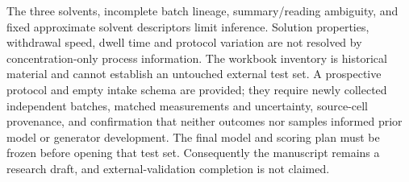 The three solvents, incomplete batch lineage, summary/reading ambiguity, and fixed approximate solvent descriptors limit inference. Solution properties, withdrawal speed, dwell time and protocol variation are not resolved by concentration-only process information. The workbook inventory is historical material and cannot establish an untouched external test set. A prospective protocol and empty intake schema are provided; they require newly collected independent batches, matched measurements and uncertainty, source-cell provenance, and confirmation that neither outcomes nor samples informed prior model or generator development. The final model and scoring plan must be frozen before opening that test set. Consequently the manuscript remains a research draft, and external-validation completion is not claimed.
